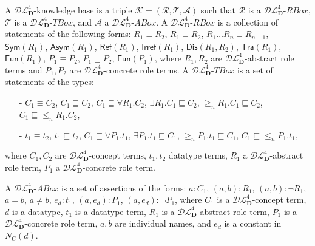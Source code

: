 \documentclass[a4paper]{llncs}
\newcommand{\shdlss}{\mathcal{DL}_{\D}^{4}}
\newcommand{\D}{\mathbf{D}}
\newcommand{\sym}{\mathsf{Sym}}
\newcommand{\asym}{\mathsf{Asym}}
\newcommand{\refl}{\mathsf{Ref}}
\newcommand{\irref}{\mathsf{Irref}}
\newcommand{\tra}{\mathsf{Tra}}
\newcommand{\fun}{\mathsf{Fun}}
\begin{document}
A $\shdlss$-knowledge base is a triple ${\mathcal K} = (\mathcal{R}, \mathcal{T}, \mathcal{A})$ such that $\mathcal{R}$ is a $\shdlss$-$RBox$, $\mathcal{T}$ is a $\shdlss$-$TBox$, and $\mathcal{A}$ a $\shdlss$-$ABox$. A $\shdlss$-$RBox$ is a collection of statements of the following forms: $R_1 \equiv R_2$, $R_1 \sqsubseteq R_2$, $R_1\ldots R_n \sqsubseteq R_{n+1}$, $\sym(R_1)$, $\asym(R_1)$, $\refl(R_1)$, $\irref(R_1)$, $\mathsf{Dis}(R_1,R_2)$,
$\tra(R_1)$, $\fun(R_1)$, $P_1 \equiv P_2$, $P_1 \sqsubseteq P_2$, $\fun(P_1)$, where $R_1,R_2$ are $\shdlss$-abstract role terms and $P_1,P_2$ are $\shdlss$-concrete role terms. A $\shdlss$-$TBox$ is a set of statements of the types:
\begin{itemize}
\item[-] $C_1 \equiv C_2$, $C_1 \sqsubseteq C_2$, $C_1 \sqsubseteq \forall R_1.C_2$, $\exists R_1.C_1 \sqsubseteq C_2$, $\geq_n\!\! R_1. C_1 \sqsubseteq C_2$, \\$C_1 \sqsubseteq {\leq_n\!\! R_1. C_2}$,
\item[-] $t_1 \equiv t_2$, $t_1 \sqsubseteq t_2$, $C_1 \sqsubseteq \forall P_1.t_1$, $\exists P_1.t_1 \sqsubseteq C_1$, $\geq_n\!\! P_1. t_1 \sqsubseteq C_1$, $C_1 \sqsubseteq {\leq_n\!\! P_1. t_1}$,
\end{itemize}
where $C_1,C_2$ are $\shdlss$-concept terms, $t_1,t_2$ datatype terms, $R_1$  a $\shdlss$-abstract role term, $P_1$ a $\shdlss$-concrete role term.

A $\shdlss$-$ABox$ is a set of assertions of the forms: $a : C_1$, $(a,b) : R_1$, $(a,b) : \neg R_1$, $a=b$, $a \neq b$, $e_{d} : t_1$, $(a, e_{d}) : P_1$, $(a, e_{d}) : \neg P_1$, where $C_1$ is a $\shdlss$-concept term, $d$ is a datatype, $t_1$ is a datatype term, $R_1$ is a $\shdlss$-abstract role term, $P_1$ is a $\shdlss$-concrete role term, $a,b$ are individual names, and $e_{d}$ is a constant in $N_{C}(d)$.
\end{document}
